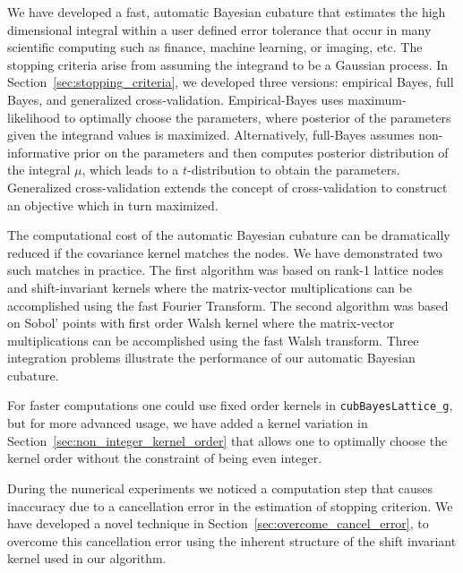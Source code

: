 \documentclass{iitthesis}          %
\newcommand{\code}[1]{\texttt{#1}}
\newcommand\secref{Section~\ref}
\begin{document}
{{{{{{\fi








We have developed a fast, automatic Bayesian cubature that estimates the high dimensional integral within a user defined error tolerance  that occur in many scientific computing such as finance, machine learning, or imaging, etc.  The stopping criteria arise from assuming the integrand to be a Gaussian process.  In \secref{sec:stopping_criteria}, we developed three versions:  empirical Bayes, full Bayes, and generalized cross-validation.  Empirical-Bayes uses maximum-likelihood to optimally choose the parameters, where posterior of the parameters given the integrand values is maximized. Alternatively, full-Bayes assumes non-informative prior on the parameters and then computes posterior distribution of the integral $\mu$, which leads to a $t$-distribution to obtain the parameters. Generalized cross-validation extends the concept of cross-validation to construct an objective which in turn maximized.

The computational cost of the automatic Bayesian cubature can be dramatically reduced if the covariance kernel matches the nodes.  We have demonstrated two such matches in practice. The first algorithm was based on rank-1 lattice nodes and shift-invariant kernels where the matrix-vector multiplications can be accomplished using the fast Fourier Transform.  The second algorithm was based on Sobol' points with first order Walsh kernel where the matrix-vector multiplications can be accomplished using the fast Walsh transform. Three integration problems illustrate the performance of our automatic Bayesian cubature.  

For faster computations one could use fixed order kernels in \code{cubBayesLattice\_g}, but for more advanced usage, we have added a kernel variation in \secref{sec:non_integer_kernel_order} that allows one to optimally choose the kernel order without the constraint of being even integer.

During the numerical experiments we noticed a computation step that causes inaccuracy due to a cancellation error in the estimation of stopping criterion.
We have developed a novel technique in \secref{sec:overcome_cancel_error}, to overcome this cancellation error using the inherent structure of the shift invariant kernel used in our algorithm.

}}}}}}
\end{document}
